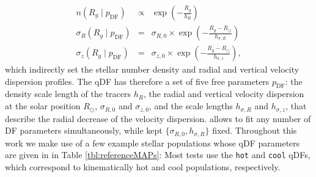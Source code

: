 \begin{eqnarray}
n(R_g \mid p_\text{DF}) &\propto& \exp\left(-\frac{R_g}{h_R} \right)\\
\sigma_R(R_g \mid p_\text{DF}) &=& \sigma_{R,0} \times \exp\left(- \frac{R_g-R_\odot}{h_{\sigma,R}} \right)\label{eq:sigmaRRg}\\
\sigma_z(R_g \mid p_\text{DF}) &=& \sigma_{z,0} \times \exp\left(- \frac{R_g-R_\odot}{h_{\sigma,z}} \right)\label{eq:sigmazRg},
\end{eqnarray}
which indirectly set the stellar number density and radial and vertical velocity dispersion profiles. The qDF has therefore a set of five free parameters $p_\text{DF}$: the density scale length of the tracers $h_R$, the radial and vertical velocity dispersion at the solar position $R_\odot$, $\sigma_{R,0}$ and $\sigma_{z,0}$, and the scale lengths $h_{\sigma,R}$ and $h_{\sigma,z}$, that describe the radial decrease of the velocity dispersion. \RM{} allows to fit any number of DF parameters simultaneously, while \citet{2013ApJ...779..115B} kept $\{\sigma_{R,0},h_{\sigma,R}\}$ fixed. Throughout this work we make use of a few example stellar populations whose qDF parameters are given in in Table \ref{tbl:referenceMAPs}: Most tests use the \texttt{hot} and \texttt{cool} qDFs, which correspond to kinematically hot and cool populations, respectively.\\

